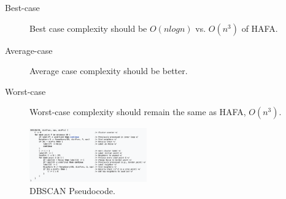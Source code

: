 \documentclass[letterpaper,twocolumn,10pt]{article}
\begin{document}
\begin{description}
\item[Best-case] Best case complexity should be $O (n log n)$ vs. $O(n^3)$ of HAFA.
\item[Average-case] Average case complexity should be better.
\item[Worst-case] Worst-case complexity should remain the same as HAFA, $O(n^3)$.

\end{description}





\begin{figure}[h]
\centering
\includegraphics[width=0.45\textwidth]{pseudocode}
\caption{\label{fig:pseudocode}DBSCAN Pseudocode.}
\end{figure}




\end{document}
